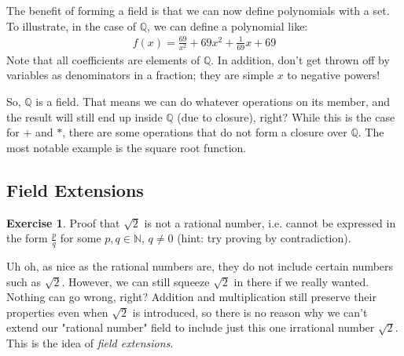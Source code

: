 \documentclass[12pt]{article}
\theoremstyle{definition}
\newtheorem{ex}{Exercise}[section]
\newcommand{\QQ}{\mathbb{Q}}
\newcommand{\NN}{\mathbb{N}}
\begin{document}
	The benefit of forming a field is that we can now define polynomials with a set. To illustrate, in the case of $\QQ$, we can define a polynomial like:
	\begin{gather*}
		f(x) = \frac{69}{x^2} + 69x^2 + \frac{1}{69}x + 69
	\end{gather*}
	Note that all coefficients are elements of $\QQ$. In addition, don't get thrown off by variables as denominators in a fraction; they are simple $x$ to negative powers!
	
	So, $\QQ$ is a field. That means we can do whatever operations on its member, and the result will still end up inside $\QQ$ (due to closure), right? While this is the case for $+$ and $*$, there are some operations that do not form a closure over $\QQ$. The most notable example is the square root function.
	
	\subsection{Field Extensions}
	
	\begin{ex}
		Proof that $\sqrt{2}$ is not a rational number, i.e. cannot be expressed in the form $\frac{p}{q}$ for some $p, q \in \NN$, $q \neq 0$ (hint: try proving by contradiction).
	\end{ex}
	
	Uh oh, as nice as the rational numbers are, they do not include certain numbers such as $\sqrt{2}$. However, we can still squeeze $\sqrt{2}$ in there if we really wanted. Nothing can go wrong, right? Addition and multiplication still preserve their properties even when $\sqrt{2}$ is introduced, so there is no reason why we can't extend our "rational number" field to include just this one irrational number $\sqrt{2}$. This is the idea of \emph{field extensions}.
	
\end{document}
